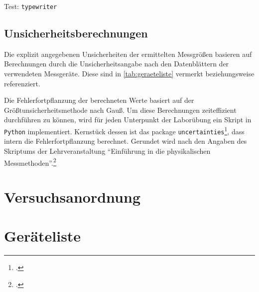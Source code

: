 \documentclass[ngerman]{scrartcl}
\begin{document}
Test: \texttt{typewriter}

\subsection{Unsicherheitsberechnungen}
\label{subsec:unsicherheitsberechnungen}

Die explizit angegebenen Unsicherheiten der ermittelten Messgrößen basieren auf Berechnungen durch die Unsicherheitsangabe nach den Datenblättern der verwendeten Messgeräte. Diese sind in \autoref{tab:geraeteliste} vermerkt beziehungsweise referenziert.

Die Fehlerfortpflanzung der berechneten Werte basiert auf der Größtunsicherheitsmethode nach Gauß. Um diese Berechnungen zeiteffizient durchführen zu können, wird für jeden Unterpunkt der Laborübung ein Skript in \verb!Python! implementiert. Kernstück dessen ist das package \verb!uncertainties!\footcite{ref:uncertainties}, dass intern die Fehlerfortpflanzung berechnet. Gerundet wird nach den Angaben des Skriptums der Lehrveranstaltung \enquote{Einführung in die physikalischen Messmethoden}.\footcite{ref:messmethoden}



\section{Versuchsanordnung}
\label{sec:versuchsanordnung}



\section{Geräteliste}
\label{sec:geraeteliste}
\end{document}
